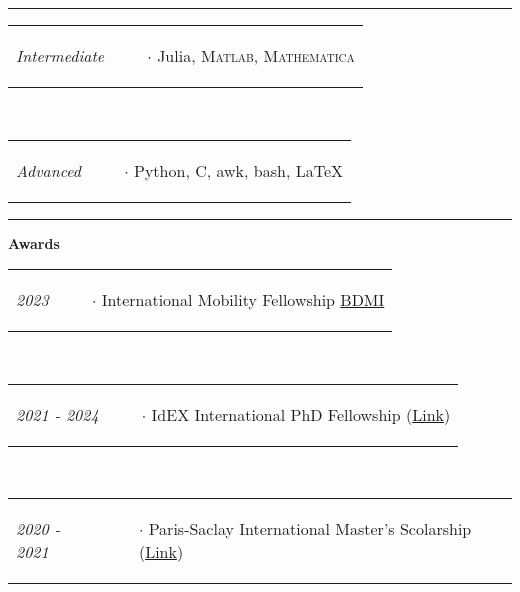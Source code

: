 \documentclass{scrartcl}
\newcommand{\NewItemEntry}[2]{
  \noindent
  \begin{tabular}[r]{p{2.5cm} p{14.0cm}}
    \-\hspace{0.5cm} \small \textit{#1}
    &
    \begin{itemize}
      \vspace{-0.65cm}
      \item[$\cdot$] #2
    \end{itemize}
  \end{tabular}
  \vspace{-0.2cm}
}
\begin{document}
\begin{cv}{}
\vspace{1em}

\par\noindent\rule{\textwidth}{0.4pt}

\vspace{1.5em}



\newpage


\noindent{}
\vspace{1em}
\small

\NewItemEntry{Intermediate}{Julia, \textsc{Matlab}, \textsc{Mathematica}}\\[\v]
\NewItemEntry{Advanced}{Python, C, awk, bash, \LaTeX}

\vspace{1.0em} %

\par\noindent\rule{\textwidth}{0.4pt}

\vspace{1.5em}
















\noindent{}
\vspace{1em}


\textcolor{carmine}{\textbf{Awards}}
\vspace{1em}

\small

\NewItemEntry{2023}{International Mobility Fellowship \href{https://www.edite-de-paris.fr/universite-paris-cite-bdmi/}{BDMI}}\\[\v]
\NewItemEntry{2021 - 2024}{IdEX International PhD Fellowship (\href{https://www.mastere.tn/en/university-of-paris-doctoral-fellowship-program-2021/}{Link})}\\[\v]
\NewItemEntry{2020 - 2021}{Paris-Saclay International Master's Scolarship (\href{https://www.universite-paris-saclay.fr/en/admission/bourses-et-aides-financieres/international-masters-scholarships-program}{Link})}



\end{cv}
\end{document}
